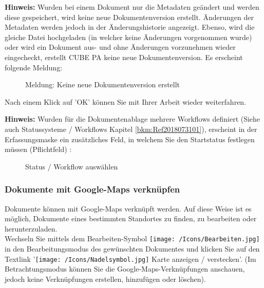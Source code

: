 \textbf{Hinweis:} Wurden bei einem Dokument nur die Metadaten geändert und werden diese gespeichert, wird keine neue Dokumentenversion erstellt. Änderungen der Metadaten werden jedoch in der Änderungshistorie angezeigt. Ebenso, wird die gleiche Datei hochgeladen (in welcher keine Änderungen vorgenommen wurde) oder wird ein Dokument aus- und ohne Änderungen vorzunehmen wieder eingecheckt, erstellt CUBE PA keine neue Dokumentenversion. Es erscheint folgende Meldung:

\begin{figure}[H]
\caption{Meldung: Keine neue Dokumentenversion erstellt}
\end{figure}

Nach einem Klick auf 'OK' können Sie mit Ihrer Arbeit wieder weiterfahren.

\vspace{\baselineskip}

\textbf{Hinweis:} Wurden für die Dokumentenablage mehrere Workflows definiert (Siehe auch Statussysteme / Workflows Kapitel \ref{bkm:Ref2018073101}), erscheint in der Erfassungsmaske ein zusätzliches Feld, in welchem Sie den Startstatus festlegen müssen (Pflichtfeld) :  

\begin{figure}[H]
\caption{Status / Workflow auswählen}
\end{figure}

\subsubsection{Dokumente mit Google-Maps verknüpfen}
\label{bkm:Ref442545553}
Dokumente können mit Google-Maps verknüpft werden. Auf diese Weise ist es möglich, Dokumente eines bestimmten Standortes zu finden, zu bearbeiten oder herunterzuladen. \\
Wechseln Sie mittels dem Bearbeiten-Symbol \texttt{[image: /Icons/Bearbeiten.jpg]} in den Bearbeitungsmodus des gewünschten Dokumentes und klicken Sie auf den Textlink '\texttt{[image: /Icons/Nadelsymbol.jpg]} \textcolor{NavyBlue}{Karte anzeigen / verstecken}'. (Im Betrachtungsmodus können Sie die Google-Maps-Verknüpfungen anschauen, jedoch keine Verknüpfungen erstellen, hinzufügen oder löschen).

